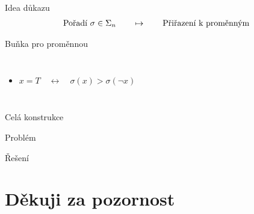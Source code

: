\documentclass [14pt,xcolor=dvipsnames]{beamer}
\begin{document}
\begin{frame}{Idea důkazu}
    \begin{align*}
        \text{Pořadí $ \sigma \in \Sigma_n $}\qquad \mapsto \qquad \text{Přiřazení k proměnným}
    \end{align*}
    
\end{frame}

\begin{frame}{Buňka pro proměnnou}
\begin{columns}
 \begin{itemize}
     \item<2-> $x=T \quad \leftrightarrow\quad \sigma(x) > \sigma(\lnot x)$
 \end{itemize}
    
\end{columns}
\end{frame}

\begin{frame}{Celá konstrukce}
    
\end{frame}

\begin{frame}{Problém}
    
\end{frame}

\begin{frame}{Řešení}
    
\end{frame}

\section*{Děkuji za pozornost}
\end{document}
